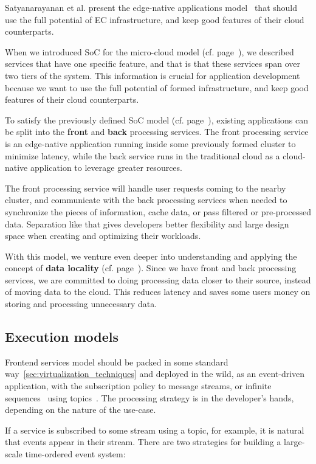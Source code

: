 Satyanarayanan et al. present the edge-native applications model~\cite{SatyanarayananK19} that should use the full potential of EC infrastructure, and keep good features of their cloud counterparts. 

When we introduced SoC for the micro-cloud model (cf. page~\pageref{services}), we described services that have one specific feature, and that is that these services span over two tiers of the system. This information is crucial for application development because we want to use the full potential of formed infrastructure, and keep good features of their cloud counterparts.

To satisfy the previously defined SoC model (cf. page~\pageref{services}), existing applications can be split into the \textbf{front} and \textbf{back} processing services. The front processing service is an edge-native application running inside some previously formed cluster to minimize latency, while the back service runs in the traditional cloud as a cloud-native application to leverage greater resources.

The front processing service will handle user requests coming to the nearby cluster, and communicate with the back processing services when needed to synchronize the pieces of information, cache data, or pass filtered or pre-processed data. Separation like that gives developers better flexibility and large design space when creating and optimizing their workloads.

With this model, we venture even deeper into understanding and applying the concept of \textbf{data locality} (cf. page~\pageref{ds:data_locality}). Since we have front and back processing services, we are committed to doing processing data closer to their source, instead of moving data to the cloud. This reduces latency and saves some users money on storing and processing unnecessary data.
%
%
\subsection{Execution models}\label{sec:execution_models}
%
Frontend services model should be packed in some standard way~\ref{sec:virtualization_techniques} and deployed in the wild, as an event-driven application, with the subscription policy to message streams, or infinite sequences~\cite{Rutten03} using topics~\cite{inproceedingsBeck}. The processing strategy is in the developer's hands, depending on the nature of the use-case. 

If a service is subscribed to some stream using a topic, for example, it is natural that events appear in their stream. There are two strategies for building a large-scale time-ordered event system:

